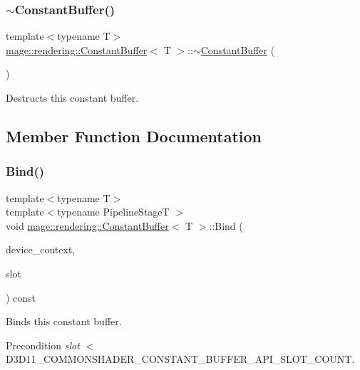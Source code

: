 \subsubsection{\texorpdfstring{$\sim$\+Constant\+Buffer()}{~ConstantBuffer()}}
{\footnotesize\ttfamily template$<$typename T$>$ \\
\mbox{\hyperlink{classmage_1_1rendering_1_1_constant_buffer}{mage\+::rendering\+::\+Constant\+Buffer}}$<$ T $>$\+::$\sim$\mbox{\hyperlink{classmage_1_1rendering_1_1_constant_buffer}{Constant\+Buffer}} (\begin{DoxyParamCaption}{ }\end{DoxyParamCaption})\hspace{0.3cm}{\ttfamily [default]}}

Destructs this constant buffer. 

\subsection{Member Function Documentation}
\mbox{\label{classmage_1_1rendering_1_1_constant_buffer_a49c3982ed5b6a01ddc8cadd509eff7f8}} 
\subsubsection{\texorpdfstring{Bind()}{Bind()}}
{\footnotesize\ttfamily template$<$typename T$>$ \\
template$<$typename Pipeline\+StageT $>$ \\
void \mbox{\hyperlink{classmage_1_1rendering_1_1_constant_buffer}{mage\+::rendering\+::\+Constant\+Buffer}}$<$ T $>$\+::Bind (\begin{DoxyParamCaption}\item[{I\+D3\+D11\+Device\+Context \&}]{device\+\_\+context,  }\item[{\mbox{\hyperlink{namespacemage_a41c104c036fba3756a74e19f793eeaa1}{U32}}}]{slot }\end{DoxyParamCaption}) const\hspace{0.3cm}{\ttfamily [noexcept]}}

Binds this constant buffer.

\begin{DoxyPrecond}{Precondition}
{\itshape slot} $<$ {\ttfamily D3\+D11\+\_\+\+C\+O\+M\+M\+O\+N\+S\+H\+A\+D\+E\+R\+\_\+\+C\+O\+N\+S\+T\+A\+N\+T\+\_\+\+B\+U\+F\+F\+E\+R\+\_\+\+A\+P\+I\+\_\+\+S\+L\+O\+T\+\_\+\+C\+O\+U\+NT}. 
\end{DoxyPrecond}

